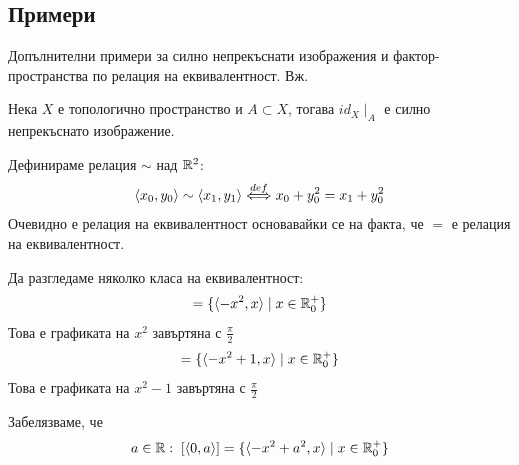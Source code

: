 \subsection{Примери}
Допълнителни примери за силно непрекъснати изображения и фактор-пространства по релация на еквивалентност. Вж. \cite[стр.~144-145]{munkrestopology}
\begin{example}
    Нека $X$ е топологично пространство и $A \subset X$, тогава $id_X\mid_A$ е силно непрекъснато изображение.
\end{example}
\begin{example}
    Дефинираме релация $\sim$ над ${\mathbb{R}}^2$:
    \begin{equation}
        \langle x_0, y_0 \rangle \sim \langle x_1, y_1 \rangle {\overset{def}{\iff}} x_0 + y_0^2 = x_1 + y_0 ^2
    \end{equation}
    Очевидно е релация на еквивалентност основавайки се на факта, че $=$ е релация на еквивалентност.

    Да разгледаме няколко класа на еквивалентност:
    \begin{equation}
        [\langle 0, 0 \rangle] = \{ \langle -x^2, x \rangle \mid x \in \R_0^+\}
    \end{equation}
    Това е графиката на $x^2$ завъртяна с $\frac{\pi}{2}$
    \begin{equation}
        [\langle 0, 1 \rangle] = \{ \langle -x^2 + 1, x \rangle \mid x \in \R_0^+\}
    \end{equation}
    Това е графиката на $x^2 - 1$ завъртяна с $\frac{\pi}{2}$

    Забелязваме, че
    \begin{equation}
        a\in {\mathbb{R}}:\; [\langle 0, a \rangle] = \{ \langle -x^2 + a^2, x \rangle \mid x \in {\mathbb{R}}_0^+\}
    \end{equation}


\end{example}
